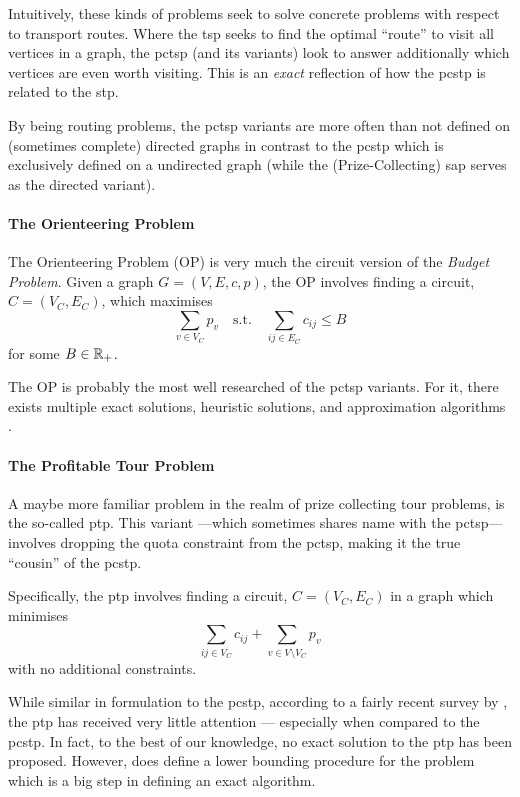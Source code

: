 Intuitively, these kinds of problems seek to solve concrete problems with respect to transport routes.
Where the \gls{tsp} seeks to find the optimal ``route'' to visit all vertices in
a graph, the \gls{pctsp} (and its variants) look to answer additionally
which vertices are even worth visiting.
This is an \textit{exact} reflection of how the \gls{pcstp} is related
to the \gls{stp}.

By being routing problems, the \gls{pctsp} variants are more often than not
defined on (sometimes complete) directed graphs in
contrast to the \gls{pcstp} which is exclusively
defined on a undirected graph (while the (Prize-Collecting)
\gls{sap} serves as the directed variant).

\paragraph{The Orienteering Problem}
The Orienteering Problem (OP) is very much the circuit version of the \textit{Budget Problem}.
Given a graph $G  = (V, E, c, p)$, the OP involves finding a circuit, $C = (V_C, E_C)$,
which maximises
\[\sum_{v \in V_C}  p_v \quad \text{s.t.} \quad \sum_{ij \in E_C} c_{ij} \leq B\]
for some $B \in \mathbb{R}_+$.

The OP is probably the most well researched of the \gls{pctsp} variants. For it, there exists
multiple exact solutions, heuristic solutions, and approximation algorithms
\citep{archetti2014chapter}.

\paragraph{The Profitable Tour Problem}
A maybe more familiar problem in the realm of prize collecting tour problems, is the
so-called \gls{ptp}. This variant ---which sometimes shares name with
the \gls{pctsp}--- involves dropping the quota constraint from the \gls{pctsp},
making it the true ``cousin'' of the \gls{pcstp}.

 Specifically, the \gls{ptp} involves finding a circuit,
 $C = (V_C, E_C)$ in a graph which minimises
 \[\sum_{ij \in V_C} c_{ij} + \sum_{v \in V \setminus V_C} p_v\]
 with no additional constraints.
 
 While similar in formulation to the \gls{pcstp}, according to a fairly recent survey by
 \citet{archetti2014chapter}, the \gls{ptp} has received very little attention
 --- especially when compared to the \gls{pcstp}.
 In fact, to the best of our knowledge, no exact solution to the \gls{ptp}
 has been proposed.
 However, \citet{dell1995prize} does define a lower bounding procedure for the problem
 which is a big step in defining an exact algorithm.
 
